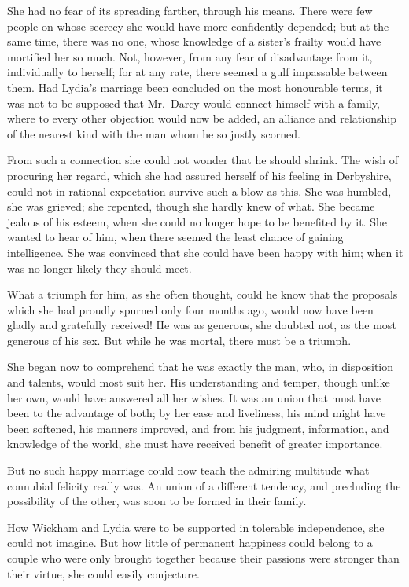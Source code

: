 She had no fear of its spreading farther, through his
means. There were few people on whose secrecy she
would have more confidently depended; but at the same
time, there was no one, whose knowledge of a sister’s
frailty would have mortified her so much. Not, however,
from any fear of disadvantage from it, individually to
herself; for at any rate, there seemed a gulf impassable
between them. Had Lydia’s marriage been concluded on
the most honourable terms, it was not to be supposed
that Mr.\ Darcy would connect himself with a family,
where to every other objection would now be added, an
alliance and relationship of the nearest kind with the
man whom he so justly scorned.

From such a connection she could not wonder that he
should shrink. The wish of procuring her regard, which
she had assured herself of his feeling in Derbyshire, could
not in rational expectation survive such a blow as this.
She was humbled, she was grieved; she repented, though
she hardly knew of what. She became jealous of his
esteem, when she could no longer hope to be benefited
by it. She wanted to hear of him, when there seemed
the least chance of gaining intelligence. She was convinced
that she could have been happy with him; when it was
no longer likely they should meet.

What a triumph for him, as she often thought, could
he know that the proposals which she had proudly spurned
only four months ago, would now have been gladly and
gratefully received! He was as generous, she doubted not,
as the most generous of his sex. But while he was mortal,
there must be a triumph.

She began now to comprehend that he was exactly the
man, who, in disposition and talents, would most suit her.
His understanding and temper, though unlike her own,
would have answered all her wishes. It was an union that
must have been to the advantage of both; by her ease
and liveliness, his mind might have been softened, his
manners improved, and from his judgment, information,
and knowledge of the world, she must have received
benefit of greater importance.

But no such happy marriage could now teach the
admiring multitude what connubial felicity really was.
An union of a different tendency, and precluding the possibility
of the other, was soon to be formed in their family.

How Wickham and Lydia were to be supported in
tolerable independence, she could not imagine. But how
little of permanent happiness could belong to a couple
who were only brought together because their passions
were stronger than their virtue, she could easily
conjecture.

